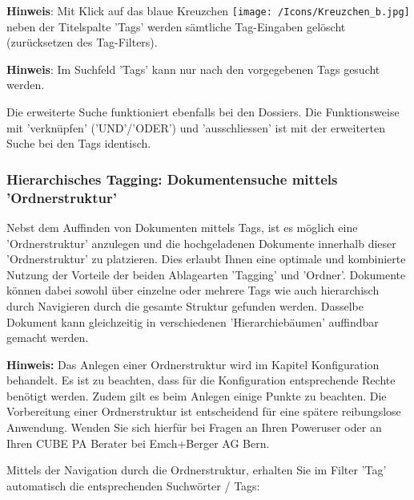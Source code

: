 \vspace{\baselineskip}

\textbf{Hinweis}: Mit Klick auf das blaue Kreuzchen \texttt{[image: /Icons/Kreuzchen\_b.jpg]} neben der Titelspalte 'Tags' werden sämtliche Tag-Eingaben gelöscht (zurücksetzen des Tag-Filters).

\vspace{\baselineskip}

\textbf{Hinweis}: Im Suchfeld 'Tags' kann nur nach den vorgegebenen Tags gesucht werden. 

\vspace{\baselineskip}

Die erweiterte Suche funktioniert ebenfalls bei den Dossiers. Die Funktionsweise mit 'verknüpfen' ('UND'/'ODER') und 'ausschliessen' ist mit der erweiterten Suche bei den Tags identisch.

\subsubsection{Hierarchisches Tagging: Dokumentensuche mittels 'Ordnerstruktur'}
\label{bkm:Ref201801849}

Nebst dem Auffinden von Dokumenten mittels Tags, ist es möglich eine 'Ordnerstruktur' anzulegen und die hochgeladenen Dokumente innerhalb dieser 'Ordnerstruktur' zu platzieren. Dies erlaubt Ihnen eine optimale und kombinierte Nutzung der Vorteile der beiden Ablagearten 'Tagging' und 'Ordner'. Dokumente können dabei sowohl über einzelne oder mehrere Tags wie auch hierarchisch durch Navigieren durch die gesamte Struktur gefunden werden. Dasselbe Dokument kann gleichzeitig in verschiedenen 'Hierarchiebäumen' auffindbar gemacht werden.

\vspace{\baselineskip}

\textbf{Hinweis:} Das Anlegen einer Ordnerstruktur wird im Kapitel Konfiguration behandelt. Es ist zu beachten, dass für die Konfiguration entsprechende Rechte benötigt werden. Zudem gilt es beim Anlegen einige Punkte zu beachten. Die Vorbereitung einer Ordnerstruktur ist entscheidend für eine spätere reibungslose Anwendung. Wenden Sie sich hierfür bei Fragen an Ihren Poweruser oder an Ihren CUBE PA Berater bei Emch+Berger AG Bern.

\vspace{\baselineskip}

Mittels der Navigation durch die Ordnerstruktur, erhalten Sie im Filter 'Tag' automatisch die entsprechenden Suchwörter / Tags:

